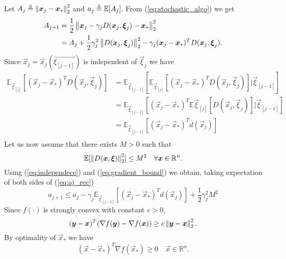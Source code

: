 Let $A_j\triangleq \left\Vert \boldsymbol{x}_j-\boldsymbol{x}_* \right\Vert^2_2$ and $a_j\triangleq\mathbb{E}[A_j]$.
From (\ref*{eq:stochastic_algo}) we get
\begin{equation}
\begin{aligned}
A_{j+1} &= \frac{1}{2}\left\Vert \boldsymbol{x}_j - \gamma_jD(\boldsymbol{x}_j,\boldsymbol{\xi}_j) -\boldsymbol{x}_* \right\Vert^2_2\\ 
&= A_j +\frac{1}{2}\gamma_j^2\left\Vert D(\boldsymbol{x}_j,\boldsymbol{\xi}_j) \right\Vert^2_2 - \gamma_j(\boldsymbol{x}_j-\boldsymbol{x}_*)^TD(\boldsymbol{x}_j,\boldsymbol{\xi}_j).
\end{aligned}
\label{eq:aj_rec}
\end{equation}
Since $\vec{x}_j = \vec{x}_j(\vec{\xi_{[j-1]}})$ is independent of $\vec{\xi}_j$ we have
\begin{equation}
\begin{aligned}
\mathbb{E}_{\vec{\xi}_{[j]}}[(\vec{x}_j-\vec{x}_*)^TD(\vec{x}_j,\vec{\xi}_j)] &= \mathbb{E}_{\vec{\xi}_{[j-1]}}[\mathbb{E}_{\vec{\xi}_{[j]}}[(\vec{x}_j-\vec{x}_*)^TD(\vec{x}_j,\vec{\xi}_j)]|\vec{\xi}_{[j-1]}]\\
&= \mathbb{E}_{\vec{\xi}_{[j-1]}}[(\vec{x}_j-\vec{x}_*)^T\mathbb{E}{\vec{\xi}_{[j]}}[D(\vec{x}_j,\vec{\xi}_j)]|\vec{\xi}_{[j-1]}]\\
&=\mathbb{E}_{\vec{\xi}_{[j-1]}}[(\vec{x}_j-\vec{x}_*)^Td(\vec{x}_j)]\\
\end{aligned}
\label{eq:independece}
\end{equation}
Let us now assume that there exists $M>0$ such that
\begin{equation}
\mathbb{E}[\left\Vert D(\boldsymbol{x},\boldsymbol{\xi}) \right\Vert^2_2]\leq M^2 \quad \forall \boldsymbol{x} \in \mathbb{R}^n.
\label{eq:gradient_bound}
\end{equation}
Using (\ref{eq:independece}) and (\ref{eq:gradient_bound}) we obtain, taking expectation of both sides of (\ref{eq:aj_rec})
\begin{equation}
a_{j+1} \leq a_j - \gamma_j\mathbb{E}_{\vec{\xi}_{[j-1]}}[(\vec{x}_j-\vec{x}_*)^Td(\vec{x}_j)] + \frac{1}{2}\gamma_j^2M^2
\label{eq:aj_rec_2}
\end{equation}
Since $f(\cdot)$ is strongly convex with constant $c>0$,
\begin{equation}
(\boldsymbol{y}-\boldsymbol{x})^T(\nabla f(\boldsymbol{y})- \nabla f(\boldsymbol{x}))\geq c \left\Vert \boldsymbol{y}-\boldsymbol{x} \right\Vert^2_2.
\label{eq:strong_convexity}
\end{equation}
By optimality of $\vec{x}_*$ we have
\begin{equation}
(\vec{x}-\vec{x}_*)^T\nabla f(\vec{x}_*) \geq 0 \quad \vec{x} \in \mathbb{R}^n.
\label{eq:optimality}
\end{equation}

